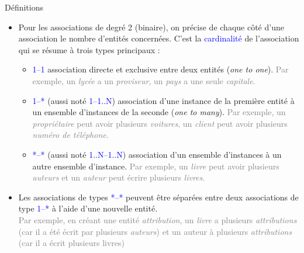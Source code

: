 \documentclass[10pt]{beamer}
\begin{document}
\begin{frame}{\Ctitle}{\stitle}
	\begin{alertblock}{Définitions}
		\begin{itemize}
			\item<2-> Pour les associations de degré 2 (binaire), on précise de chaque côté d'une association le nombre d'entités concernées. C'est la \textcolor{blue}{cardinalité} de l'association qui se résume à trois types principaux :
				\begin{itemize}
					\item<3-> \textcolor{blue}{1--1} association directe et exclusive entre deux entités (\textit{one to one}).
						\onslide<4->\textcolor{gray}{Par exemple, un \textit{lycée} a un \textit{proviseur}, un \textit{pays} a une seule \textit{capitale}.}
					\item<5-> \textcolor{blue}{1--*} (aussi noté \textcolor{blue}{1--1..N})  association d'une instance de la première entité à un ensemble d'instances de la seconde (\textit{one to many}).
						\onslide<6->\textcolor{gray}{Par exemple, un \textit{propriétaire} peut avoir plusieurs \textit{voitures}, un \textit{client} peut avoir plusieurs \textit{numéro de téléphone}.}
					\item<7-> \textcolor{blue}{*--*} (aussi noté \textcolor{blue}{1..N--1..N}) association d'un ensemble d'instances à un autre ensemble d'instance.
						\onslide<8->\textcolor{gray}{Par exemple, un \textit{livre} peut avoir plusieurs \textit{auteurs} et un \textit{auteur} peut écrire plusieurs \textit{livres}.}
				\end{itemize}
			\item<9-> Les associations de types \textcolor{blue}{*--*} peuvent être séparées entre deux associations de type \textcolor{blue}{1--*} à l'aide d'une nouvelle entité. \\
				\onslide<10->\textcolor{gray}{\small Par exemple, en créant une entité \textit{attribution}, un \textit{livre}  a plusieurs \textit{attributions} (car il a été écrit par plusieurs \textit{auteurs}) et un auteur à plusieurs \textit{attributions} (car il a écrit plusieurs livres)}
		\end{itemize}
	\end{alertblock}
\end{frame}
\end{document}
